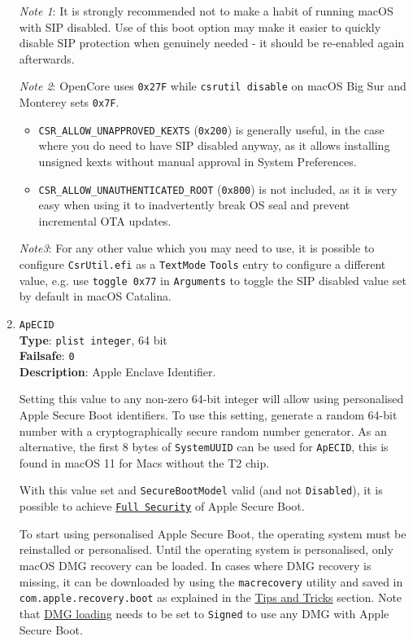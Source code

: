 \documentclass[]{article}
\providecommand{\tightlist}{%
  \setlength{\itemsep}{0pt}\setlength{\parskip}{0pt}}
\begin{document}
\begin{enumerate}
  \emph{Note 1}: It is strongly recommended not to make a habit of running macOS with
  SIP disabled. Use of this boot option may make it easier to quickly disable SIP
  protection when genuinely needed - it should be re-enabled again afterwards.

  \emph{Note 2}: OpenCore uses \texttt{0x27F} while \texttt{csrutil disable} on macOS Big Sur
  and Monterey sets \texttt{0x7F}.
  \begin{itemize}
  \tightlist
  \item \texttt{CSR\_ALLOW\_UNAPPROVED\_KEXTS} (\texttt{0x200}) is generally useful, in the case
  where you do need to have SIP disabled anyway, as it allows installing unsigned kexts without
  manual approval in System Preferences.
  \item \texttt{CSR\_ALLOW\_UNAUTHENTICATED\_ROOT} (\texttt{0x800}) is not included, as it is
  very easy when using it to inadvertently break OS seal and prevent incremental OTA updates.
  \end{itemize}

  \emph{Note3}: For any other value which you may need to use, it is possible to
  configure \texttt{CsrUtil.efi} as a \texttt{TextMode} \texttt{Tools} entry to configure a
  different value, e.g. use \texttt{toggle\ 0x77} in \texttt{Arguments} to toggle the
  SIP disabled value set by default in macOS Catalina.

\item
  \texttt{ApECID}\\
  \textbf{Type}: \texttt{plist\ integer}, 64 bit\\
  \textbf{Failsafe}: \texttt{0}\\
  \textbf{Description}: Apple Enclave Identifier.

  Setting this value to any non-zero 64-bit integer will allow using
  personalised Apple Secure Boot identifiers. To use this setting,
  generate a random 64-bit number with a cryptographically secure
  random number generator. As an alternative, the first 8 bytes of \texttt{SystemUUID}
  can be used for \texttt{ApECID}, this is found in macOS 11 for Macs without
  the T2 chip.

  With this value set and \texttt{SecureBootModel} valid
  (and not \texttt{Disabled}), it is possible to achieve
  \href{https://support.apple.com/en-us/HT208330}{\texttt{Full Security}} of Apple
  Secure Boot.

  To start using personalised Apple Secure Boot, the operating system must be
  reinstalled or personalised. Until the operating system is personalised,
  only macOS DMG recovery can be loaded. In cases where DMG recovery is missing,
  it can be downloaded by using the \texttt{macrecovery} utility and saved in
  \texttt{com.apple.recovery.boot} as explained in the
  \hyperref[reinstallmacos]{Tips and Tricks} section. Note that
  \hyperref[securedmgloading]{DMG loading} needs to be set to \texttt{Signed}
  to use any DMG with Apple Secure Boot.


\end{enumerate}
\end{document}
